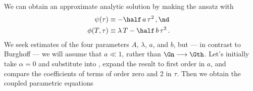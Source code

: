 We can obtain an approximate analytic solution by making the ansatz  with
\begin{align}
    \psi(\tau) &\equiv -\half\, a\, \tau^2\, , \nd \\
    \phi(T,\tau) &\equiv \lambda\, T - \half\, b\, \tau^2\, .
\end{align}
We seek estimates of the four parameters $A$, $\lambda$, $a$, and $b$, but --- in contrast to Burghoff --- we will assume that $a \ll 1$, rather than $\Gn \longrightarrow \Gth$. Let's initially take $\alpha = 0$ and substitute  into , expand the result to first order in $a$, and compare the coefficients of terms of order zero and 2 in $\tau$. Then we obtain the coupled parametric equations
